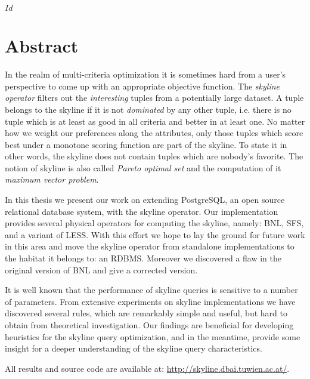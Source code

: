 
\svnInfo $Id$


\chapter*{Abstract\revision}


In the realm of multi-criteria optimization it is sometimes hard from
a user's perspective to come up with an appropriate objective
function.
%
The \emph{skyline operator} filters out the \emph{interesting} tuples
from a potentially large dataset.  A tuple belongs to the skyline if
it is not \emph{dominated} by any other tuple, i.e. there is no tuple
which is at least as good in all criteria and better in at least one.
%
No matter how we weight our preferences along the attributes, only
those tuples which score best under a monotone scoring function are
part of the skyline.
%
To state it in other words, the skyline does not contain tuples which
are nobody's favorite.
%
The notion of skyline is also called \emph{Pareto optimal set} and the
computation of it \emph{maximum vector problem}.


In this thesis we present our work on extending PostgreSQL, an open
source relational database system, with the skyline operator.
%
Our implementation provides several physical operators for computing
the skyline, namely: BNL, SFS, and a variant of LESS.
%
With this effort we hope to lay the ground for future work in this
area and move the skyline operator from standalone implementations to
the habitat it belongs to: an RDBMS.
%
Moreover we discovered a flaw in the original version of BNL and give
a corrected version.

It is well known that the performance of skyline queries is sensitive
to a number of parameters.  
%
From extensive experiments on skyline implementations we have
discovered several rules, which are remarkably simple and useful, but
hard to obtain from theoretical investigation.
%
Our findings are beneficial for developing heuristics for the skyline
query optimization, and in the meantime, provide some insight for a
deeper understanding of the skyline query characteristics.

All results and source code are available at:
\url{http://skyline.dbai.tuwien.ac.at/}.
